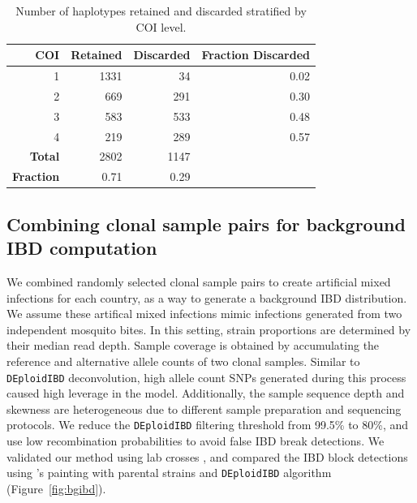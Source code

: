 \documentclass[9pt]{article}
\begin{document}
\begin{table}[ht]
\centering
\begin{tabular}{r|r|r|r}
\textbf{COI}  & \textbf{Retained} & \textbf{Discarded} & \textbf{Fraction Discarded} \\
\hline
1 & 1331 & 34 & 0.02 \\
2 & 669 & 291 & 0.30 \\
3 & 583 & 533 & 0.48 \\
4 & 219 & 289 & 0.57 \\
\hline
\textbf{Total} & 2802 & 1147 &  \\
\hline
\textbf{Fraction} & 0.71 & 0.29 & \\
\end{tabular}
\vspace{.2cm}
\caption{Number of haplotypes retained and discarded stratified by COI level.}
\label{table:haps-discarded-by-COI}
\end{table}


\subsection{Combining clonal sample pairs for background IBD computation}
We combined randomly selected clonal sample pairs to create artificial mixed infections for  each country, as a way to generate a background IBD distribution. We assume these artifical mixed infections mimic infections generated from two independent mosquito bites. In this setting, strain proportions are determined by their median read depth.  Sample coverage is obtained by accumulating the reference and alternative allele counts of two clonal samples. Similar to {\tt DEploidIBD} deconvolution, high allele count SNPs generated during this process caused high leverage in the model. Additionally, the sample sequence depth and skewness are heterogeneous due to different sample preparation and sequencing protocols. We reduce the {\tt DEploidIBD} filtering threshold from 99.5\% to 80\%, and use low recombination probabilities to avoid false IBD break detections. We validated our method using lab crosses \citep{Miles2016}, and compared the IBD block detections using \citet{Li2003}'s painting with parental strains and {\tt DEploidIBD} algorithm (Figure~\ref{fig:bgibd}).
\end{document}
